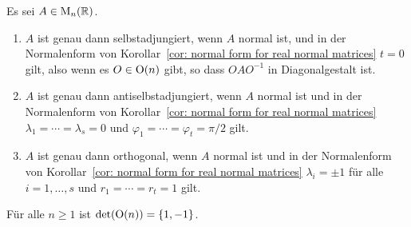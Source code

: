 \begin{corollary}
  Es sei $A \in \mathrm{M}_n(\mathbb{R})$.
  \begin{enumerate}[leftmargin=*, label=\roman*)]
    \item
      $A$ ist genau dann selbstadjungiert, wenn $A$ normal ist, und in der Normalenform von Korollar~\ref{cor: normal form for real normal matrices} $t = 0$ gilt, also wenn es $O \in \mathrm{O}(n)$ gibt, so dass $O A O^{-1}$ in Diagonalgestalt ist.
    \item
      $A$ ist genau dann antiselbstadjungiert, wenn $A$ normal ist und in der Normalenform von Korollar~\ref{cor: normal form for real normal matrices} $\lambda_1 = \dotsb = \lambda_s = 0$ und $\varphi_1 = \dotsb = \varphi_t = \pi/2$ gilt.
    \item
      $A$ ist genau dann orthogonal, wenn $A$ normal ist und in der Normalenform von Korollar~\ref{cor: normal form for real normal matrices} $\lambda_i = \pm 1$ für alle $i = 1, \dotsc, s$ und $r_1 = \dotsb = r_t = 1$ gilt.
  \end{enumerate}
\end{corollary}


\begin{corollary}
  Für alle $n \geq 1$ ist $\det(\mathrm{O}(n)) = \{1,-1\}$.
\end{corollary}

























